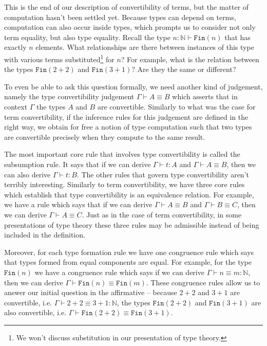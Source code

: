 \documentclass[declaration,mgr,english,shortabstract]{iithesis}
\newcommand{\m}[1]{\texttt{#1}}
\newcommand{\type}[2]{#1 \vdash #2}
\newcommand{\typeconv}[3]{#1 \vdash #2 \equiv #3}
\newcommand{\term}[3]{#1 \vdash #2 : #3}
\newcommand{\termconv}[4]{#1 \vdash #2 \equiv #3 : #4}
\newcommand{\N}{\mathbb{N}}
\newcommand{\Fin}[1]{\m{Fin}(#1)}
\begin{document}
This is the end of our description of convertibility of terms, but the matter of computation hasn't been settled yet. Because types can depend on terms, computation can also occur inside types, which prompts us to consider not only term equality, but also type equality. Recall the type $\type{n : \N}{\Fin{n}}$ that has exactly $n$ elements. What relationships are there between instances of this type with various terms substituted\footnote{We won't discuss substitution in our presentation of type theory.} for $n$? For example, what is the relation between the types $\Fin{2 + 2}$ and $\Fin{3 + 1}$? Are they the same or different?

To even be able to ask this question formally, we need another kind of judgement, namely the type convertibility judgement $\typeconv{\Gamma}{A}{B}$ which asserts that in context $\Gamma$ the types $A$ and $B$ are convertible. Similarly to what was the case for term convertibility, if the inference rules for this judgement are defined in the right way, we obtain for free a notion of type computation such that two types are convertible precisely when they compute to the same result.

The most important core rule that involves type convertibility is called the subsumption rule. It says that if we can derive $\term{\Gamma}{t}{A}$ and $\typeconv{\Gamma}{A}{B}$, then we can also derive $\term{\Gamma}{t}{B}$. The other rules that govern type convertibility aren't terribly interesting. Similarly to term convertibility, we have three core rules which establish that type convertibility is an equivalence relation. For example, we have a rule which says that if we can derive $\typeconv{\Gamma}{A}{B}$ and $\typeconv{\Gamma}{B}{C}$, then we can derive $\typeconv{\Gamma}{A}{C}$. Just as in the case of term convertibility, in some presentations of type theory these three rules may be admissible instead of being included in the definition.

Moreover, for each type formation rule we have one congruence rule which says that types formed from equal components are equal. For example, for the type $\Fin{n}$ we have a congruence rule which says if we can derive $\termconv{\Gamma}{n}{m}{\N}$, then we can derive $\typeconv{\Gamma}{\Fin{n}}{\Fin{m}}$. These congruence rules allow us to answer our initial question in the affirmative -- because $2 + 2$ and $3 + 1$ are convertible, i.e. $\termconv{\Gamma}{2 + 2}{3 + 1}{\N}$, the types $\Fin{2 + 2}$ and $\Fin{3 + 1}$ are also convertible, i.e. $\typeconv{\Gamma}{\Fin{2 + 2}}{\Fin{3 + 1}}$.
\end{document}
